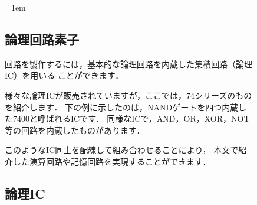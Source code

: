 \begin{figure}[bt]
\begin{framed}{\parindent=1em
\subsection*{論理回路素子}
回路を製作するには，基本的な論理回路を内蔵した集積回路（論理IC）を用いる
ことができます．

様々な論理ICが販売されていますが，ここでは，74シリーズのものを紹介します．
下の例に示したのは，NANDゲートを四つ内蔵した7400と呼ばれるICです．
同様なICで，AND，OR，XOR，NOT等の回路を内蔵したものがあります．

このようなIC同士を配線して組み合わせることにより，
本文で紹介した演算回路や記憶回路を実現することができます．

\subsection*{論理IC}
\centerline{}
}\end{framed}
\end{figure}
